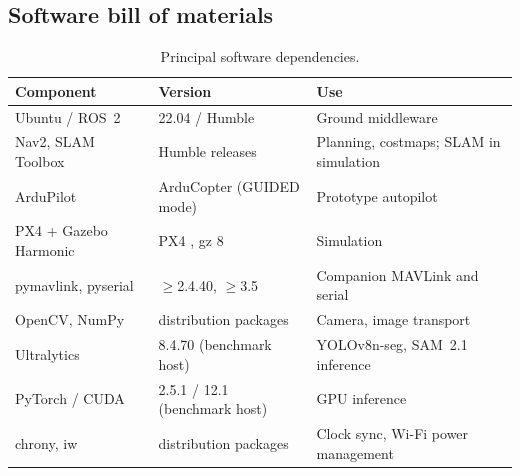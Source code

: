 \subsection{Software bill of materials}

\begin{table}[H]
\centering\small
\caption{Principal software dependencies.}
\label{tab:sbom}
\begin{tabularx}{\textwidth}{l l L}
\toprule
\textbf{Component} & \textbf{Version} & \textbf{Use} \\
\midrule
Ubuntu / ROS~2 & 22.04 / Humble & Ground middleware \\
Nav2, SLAM Toolbox & Humble releases & Planning, costmaps; SLAM in simulation \\
ArduPilot & ArduCopter (GUIDED mode) & Prototype autopilot \\
PX4 + Gazebo Harmonic & PX4 , gz 8 & Simulation \\
pymavlink, pyserial & $\ge$2.4.40, $\ge$3.5 & Companion MAVLink and serial \\
OpenCV, NumPy & distribution packages & Camera, image transport \\
Ultralytics & 8.4.70 (benchmark host) & YOLOv8n-seg, SAM~2.1 inference \\
PyTorch / CUDA & 2.5.1 / 12.1 (benchmark host) & GPU inference \\
chrony, iw & distribution packages & Clock sync, Wi-Fi power management \\
\bottomrule
\end{tabularx}
\end{table}
